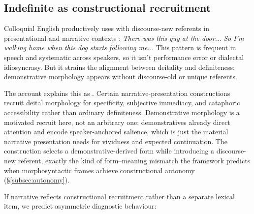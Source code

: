\documentclass[12pt,letterpaper]{article}
\begin{document}
\subsection{Indefinite  as constructional recruitment}

Colloquial English productively uses  with discourse-new referents in presentational and narrative contexts \parencite{prince1981,GernsbacherShroyer1989}:
\ea 
\ea \textit{There was this guy at the door...}
\ex \textit{So I'm walking home when this dog starts following me...}
\z
\z
\noindent This pattern is frequent in speech and systematic across speakers, so it isn't performance error or dialectal idiosyncrasy. But it strains the alignment between deitality and definiteness: demonstrative morphology appears without discourse-old or unique referents.

The account explains this as . Certain narrative-presentation constructions recruit deital morphology for specificity, subjective immediacy, and cataphoric accessibility rather than ordinary definiteness. Demonstrative morphology is a motivated recruit here, not an arbitrary one: demonstratives already direct attention and encode speaker-anchored salience, which is just the material narrative presentation needs for vividness and expected continuation. The construction selects a demonstrative-derived form while introducing a discourse-new referent, exactly the kind of form--meaning mismatch the framework predicts when morphosyntactic frames achieve constructional autonomy (§\ref{subsec:autonomy}).

If narrative  reflects constructional recruitment rather than a separate lexical item, we predict asymmetric diagnostic behaviour:
\end{document}
